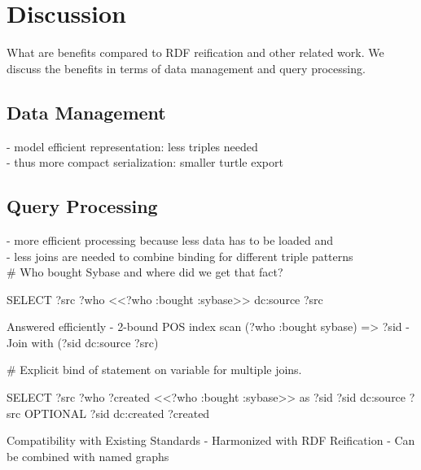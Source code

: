 \section{Discussion}
What are benefits compared to RDF reification and other related work. We discuss the benefits in terms of data management and query processing.

\subsection{Data Management}
- model efficient representation: less triples needed\\
- thus more compact serialization: smaller turtle export\\

\subsection{Query Processing}
- more efficient processing because less data has to be loaded and \\
- less joins are needed to combine binding for different triple patterns\\


 \# Who bought Sybase and where did we get that fact?

SELECT ?src ?who {
   <<?who :bought :sybase>> dc:source ?src
}

Answered efficiently
-	2-bound POS index scan (?who :bought sybase) => ?sid
-	Join with (?sid dc:source ?src)

\# Explicit bind of statement on variable for multiple joins.

SELECT ?src ?who ?created {
   <<?who :bought :sybase>> as ?sid
   ?sid dc:source ?src
   OPTIONAL {?sid dc:created ?created}
}

Compatibility with Existing Standards
-	Harmonized with RDF Reification
-	Can be combined with named graphs

